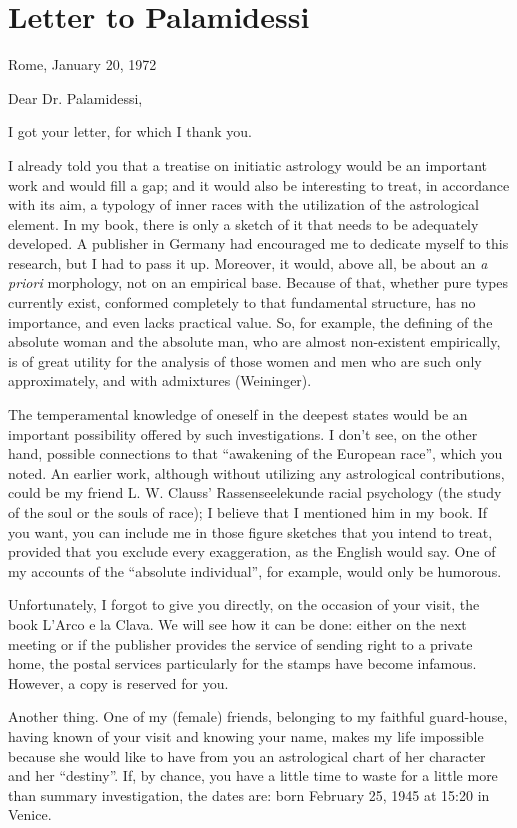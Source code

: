 \section{Letter to Palamidessi}

Rome, January 20, 1972

Dear Dr. Palamidessi,

I got your letter, for which I thank you.

I already told you that a treatise on initiatic astrology would be an important work and would fill a gap; and it would also be interesting to treat, in accordance with its aim, a typology of inner races with the utilization of the astrological element. In my book, there is only a sketch of it that needs to be adequately developed. A publisher in Germany had encouraged me to dedicate myself to this research, but I had to pass it up. Moreover, it would, above all, be about an \emph{a priori} morphology, not on an empirical base. Because of that, whether pure types currently exist, conformed completely to that fundamental structure, has no importance, and even lacks practical value. So, for example, the defining of the absolute woman and the absolute man, who are almost non-existent empirically, is of great utility for the analysis of those women and men who are such only approximately, and with admixtures (Weininger).

The temperamental knowledge of oneself in the deepest states would be an important possibility offered by such investigations. I don't see, on the other hand, possible connections to that ``awakening of the European race'', which you noted. An earlier work, although without utilizing any astrological contributions, could be my friend L. W. Clauss' Rassenseelekunde racial psychology (the study of the soul or the souls of race); I believe that I mentioned him in my book. If you want, you can include me in those figure sketches that you intend to treat, provided that you exclude every exaggeration, as the English would say. One of my accounts of the ``absolute individual'', for example, would only be humorous.

Unfortunately, I forgot to give you directly, on the occasion of your visit, the book L'Arco e la Clava. We will see how it can be done: either on the next meeting or if the publisher provides the service of sending right to a private home, the postal services particularly for the stamps have become infamous. However, a copy is reserved for you.

Another thing. One of my (female) friends, belonging to my faithful guard-house, having known of your visit and knowing your name, makes my life impossible because she would like to have from you an astrological chart of her character and her ``destiny''. If, by chance, you have a little time to waste for a little more than summary investigation, the dates are: born February 25, 1945 at 15:20 in Venice.

